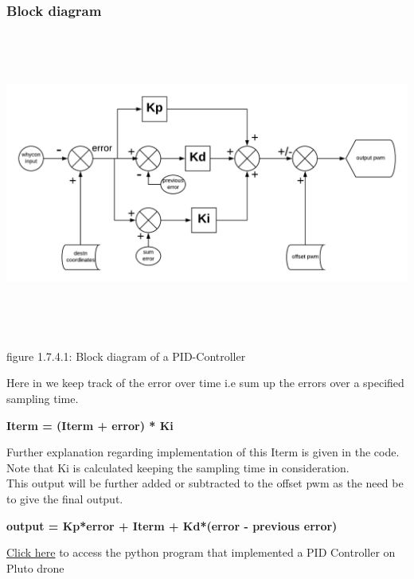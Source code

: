 \documentclass[a4paper,12pt,oneside]{book}
\begin{document}
\subsubsection{\textbf{Block diagram}}
\begin{flushleft}
\includegraphics[width = 15cm , height= 10cm]{PID-controller.png}
\end{flushleft}
\begin{center}
    figure 1.7.4.1: Block diagram of a PID-Controller
\end{center}
Here in we keep track of the error over time i.e sum up the errors over a specified sampling time.\\
\begin{center}
   \textbf{ Iterm = (Iterm + error) * Ki}
\end{center}
Further explanation regarding implementation of this Iterm is given in the code.\\
Note that Ki  is calculated keeping the sampling time in consideration.\\
This output will be further  added or subtracted to the offset pwm as the need be to give the final output.
\begin{center}
    \textbf{output = Kp*error + Iterm + Kd*(error - previous error)}
\end{center}
\href{https://github.com/eYSIP-2018/Autotuning-of-Controller-For-Drone/blob/karthik/PID-controller.py}{Click here} to access the python program that implemented a PID Controller on Pluto drone\\
\end{document}
